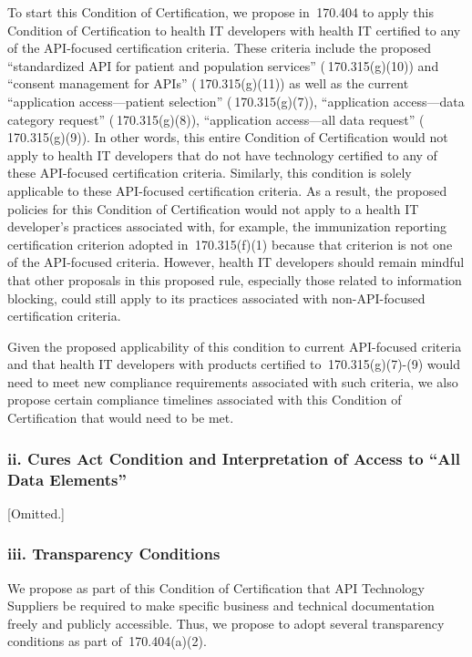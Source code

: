 \documentclass[twoside,11pt]{article}
\begin{document}
          To start this Condition of Certification, we propose in \textsection{} 170.404 to apply this Condition of Certification to health IT developers with health IT certified to any of the API-focused certification criteria. These criteria include the proposed “standardized API for patient and population services” (\textsection{} 170.315(g)(10)) and “consent management for APIs” (\textsection{} 170.315(g)(11)) as well as the current “application access—patient selection” (\textsection{} 170.315(g)(7)), “application access—data category request” (\textsection{} 170.315(g)(8)), “application access—all data request” (\textsection{} 170.315(g)(9)). In other words, this entire Condition of Certification would not apply to health IT developers that do not have technology certified to any of these API-focused certification criteria. Similarly, this condition is solely applicable to these API-focused certification criteria. As a result, the proposed policies for this Condition of Certification would not apply to a health IT developer's practices associated with, for example, the immunization reporting certification criterion adopted in \textsection{} 170.315(f)(1) because that criterion is not one of the API-focused criteria. However, health IT developers should remain mindful that other proposals in this proposed rule, especially those related to information blocking, could still apply to its practices associated with non-API-focused certification criteria.


          Given the proposed applicability of this condition to current API-focused criteria and that health IT developers with products certified to \textsection{}\textsection{} 170.315(g)(7)-(9) would need to meet new compliance requirements associated with such criteria, we also propose certain compliance timelines associated with this Condition of Certification that would need to be met.


          \subsubsection{ii. Cures Act Condition and Interpretation of Access to “All Data Elements”}

[Omitted.]

          \subsubsection{iii. Transparency Conditions}

          We propose as part of this Condition of Certification that API Technology Suppliers be required to make specific business and technical documentation freely and publicly accessible. Thus, we propose to adopt several transparency conditions as part of \textsection{} 170.404(a)(2).
\end{document}
